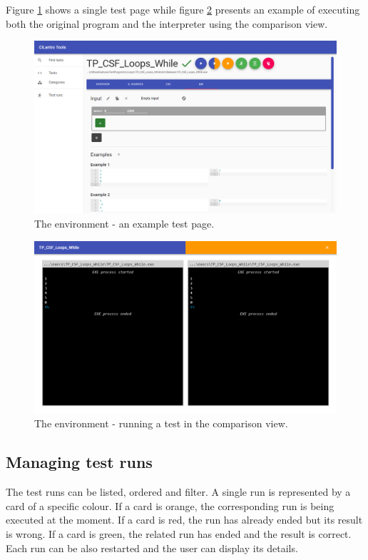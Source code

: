 \documentclass[declaration,shortabstract,english,mgr]{iithesis}
\begin{document}
Figure \ref{fig:tools_test} shows a single test page while figure \ref{fig:tools_run_both} presents an example of executing both the original program and the interpreter using the comparison view.

\begin{figure}
	\includegraphics[width=1\textwidth]{tools_test.png}
    \centering
    \caption{The environment - an example test page.}
    \label{fig:tools_test}
\end{figure}

\begin{figure}
	\includegraphics[width=1\textwidth]{tools_run_both.png}
    \centering
    \caption{The environment - running a test in the comparison view.}
    \label{fig:tools_run_both}
\end{figure}

\subsection{Managing test runs}

The test runs can be listed, ordered and filter. A single run is represented by a card of a specific colour. If a card is orange, the corresponding run is being executed at the moment. If a card is red, the run has already ended but its result is wrong. If a card is green, the related run has ended and the result is correct. Each run can be also restarted and the user can display its details.
\end{document}
